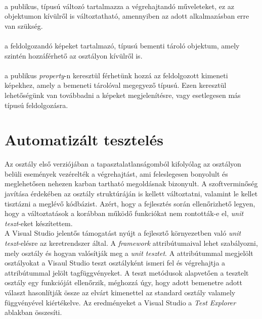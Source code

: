 \paragraph{} a publikus,  típusú változó tartalmazza a végrehajtandó műveleteket, ez az objektumon kívülről is változtatható, amennyiben az adott alkalmazásban erre van szükség.

\paragraph{} a feldolgozandó képeket tartalmazó,  típusú bementi tároló objektum, amely szintén hozzáférhető az osztályon kívülről is.

\paragraph{} a publikus \emph{property}-n keresztül férhetünk hozzá az feldolgozott kimeneti képekhez, amely a bemeneti tárolóval megegyező típusú. Ezen keresztül lehetőségünk van továbbadni a képeket megjelenítésre, vagy esetlegesen más típusú feldolgozásra.


\section{Automatizált tesztelés}

Az  osztály első verziójában a tapasztalatlanságomból kifolyólag az osztályon belüli események vezérelték a végrehajtást, ami feleslegesen bonyolult és meglehetősen nehezen karban tartható megoldásnak bizonyult. A szoftverminőség javítása érdekében az osztály struktúráján is kellett változtatni, valamint le kellet tisztázni a meglévő kódbázist. Azért, hogy a fejlesztés során ellenőrizhető legyen, hogy a változtatások a korábban működő funkciókat nem rontották-e el, \emph{unit teszt}-eket készítettem.\\
A Visual Studio jelentős támogatást nyújt a fejlesztő környezetben való \emph{unit teszt}-elésre az  keretrendszer által. A \emph{framework} attribútumaival lehet szabályozni, mely osztály és hogyan valósítják meg a \emph{unit tesztet}. A \code{[TestClass]} attribútummal megjelölt osztályokat a Visaul Studio teszt osztályként ismeri fel és végrehajtja a \code{[TestMethod]} attribútummal jelölt tagfüggvényeket. A teszt metódusok alapvetően a tesztelt osztály egy funkcióját ellenőrzik, méghozzá úgy, hogy adott bemenetre adott választ hasonlítják össze az elvárt kimenettel az  standard osztály valamely függvényével kiértékelve. Az eredményeket a Visual Studio a \emph{Test Explorer} ablakban összesíti.

